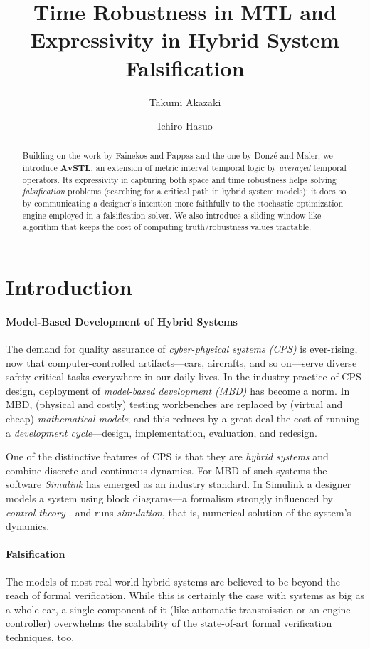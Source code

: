 \documentclass[envcountsect,orivec]{llncs} \usepackage{etex} \usepackage[]{graphicx}
\title{
Time Robustness in MTL and
\\Expressivity in
  Hybrid System Falsification
}
\author{
Takumi Akazaki
 \inst{1,2}
\and
Ichiro Hasuo
\inst{1}
 }
\institute{
The University of Tokyo, Japan
    \and
    JSPS Research Fellow
}
\newcommand{\AvSTL}{\textbf{AvSTL}}
\begin{document}
\maketitle


\begin{abstract}
  Building on the work by Fainekos and Pappas and the one by Donz\'{e}
  and Maler, we introduce $\AvSTL$, an extension of metric interval
  temporal logic by \emph{averaged} temporal operators.  Its
  expressivity in capturing both space and time robustness helps solving
  \emph{falsification} problems (searching for a critical path in
  hybrid system models); it does so by communicating a designer's intention more
  faithfully to the stochastic optimization engine employed in a
  falsification solver.  We also introduce a sliding window-like
  algorithm that keeps the cost of computing truth/robustness values tractable.
   


\end{abstract}


\section{Introduction}\label{sec:introduction}
\paragraph{Model-Based Development of Hybrid Systems}
The demand for quality assurance of \emph{cyber-physical systems (CPS)} is
ever-rising, now that computer-controlled artifacts---cars, aircrafts,
and so on---serve diverse safety-critical tasks 
everywhere in our daily lives.  In the industry practice of CPS design, deployment
of \emph{model-based development (MBD)} has become a norm. 
In MBD, (physical and costly) testing workbenches are replaced 
by (virtual and cheap) \emph{mathematical models}; 
and this reduces by a great deal the cost of running 
a \emph{development cycle}---design, implementation, evaluation, and redesign.

One of the distinctive features of CPS is that they are \emph{hybrid systems} 
and combine discrete and continuous
dynamics. For MBD of such systems the software \emph{Simulink} has emerged as an
industry standard. In Simulink a designer models a system using block
diagrams---a formalism  strongly influenced by \emph{control theory}---and 
runs \emph{simulation}, that is, numerical solution of the system's dynamics.


\paragraph{Falsification}
The models of most real-world hybrid systems are believed to be beyond
the reach of formal verification.  While this is certainly the case with 
systems as big as a whole car,
a single component of it (like automatic transmission or an engine
controller)  overwhelms the scalability of
the state-of-art formal verification techniques, too.
\end{document}
